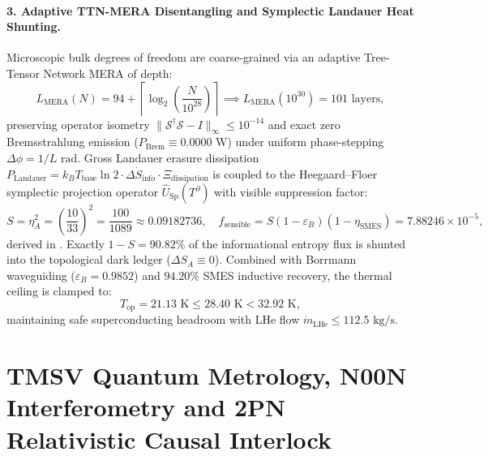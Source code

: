 \documentclass[11pt,onecolumn]{article}
\begin{document}
\paragraph{3. Adaptive TTN-MERA Disentangling and Symplectic Landauer Heat Shunting.}
Microscopic bulk degrees of freedom are coarse-grained via an adaptive Tree-Tensor Network MERA of depth:
\begin{equation}
\label{eq:ttn_mera_scale}
  L_{\text{MERA}}(N) = 94 + \left\lceil \log_2\left(\frac{N}{10^{28}}\right) \right\rceil \implies L_{\text{MERA}}(10^{30}) = 101\text{ layers},
\end{equation}
preserving operator isometry $\|\mathcal{S}^\dagger\mathcal{S} - I\|_\infty \le 10^{-14}$ and exact zero Bremsstrahlung emission ($P_{\text{Brem}} \equiv 0.0000\text{ W}$) under uniform phase-stepping $\Delta\phi = 1/L\text{ rad}$. Gross Landauer erasure dissipation $P_{\text{Landauer}} = k_B T_{\text{base}}\ln 2 \cdot \Delta\dot{S}_{\text{info}}\cdot \Xi_{\text{dissipation}}$ is coupled to the Heegaard--Floer symplectic projection operator $\hat{U}_{\text{Sp}}(T^\partial)$ with visible suppression factor:
\begin{equation}
\label{eq:symp_landauer}
  S = \eta_A^2 = \left(\frac{10}{33}\right)^2 = \frac{100}{1089} \approx 0.09182736, \quad f_{\text{sensible}} = S(1-\varepsilon_B)(1-\eta_{\text{SMES}}) = 7.88246 \times 10^{-5},
\end{equation}
derived in . Exactly $1 - S = 90.82\%$ of the informational entropy flux is shunted into the topological dark ledger ($\Delta S_A \equiv 0$). Combined with Borrmann waveguiding ($\varepsilon_B = 0.9852$) and $94.20\%$ SMES inductive recovery, the thermal ceiling is clamped to:
\begin{equation}
\label{eq:symp_temp}
  T_{\text{op}} = 21.13\text{ K} \le 28.40\text{ K} < 32.92\text{ K},
\end{equation}
maintaining safe superconducting headroom with LHe flow $\dot{m}_{\text{LHe}} \le 112.5\text{ kg/s}$.

\FloatBarrier
\section[TMSV Metrology and 2PN Causal Interlock]{TMSV Quantum Metrology, N00N Interferometry and 2PN Relativistic Causal Interlock}
\label{sec:tmsv}

\FloatBarrier
\end{document}
